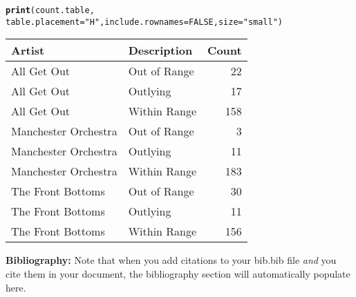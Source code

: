 \documentclass{article}\usepackage[]{graphicx}\usepackage[]{xcolor}
\makeatletter
\newcommand{\hlnum}[1]{\textcolor[rgb]{0.686,0.059,0.569}{#1}}%
\newcommand{\hlsng}[1]{\textcolor[rgb]{0.192,0.494,0.8}{#1}}%
\newcommand{\hldef}[1]{\textcolor[rgb]{0.345,0.345,0.345}{#1}}%
\newcommand{\hlkwc}[1]{\textcolor[rgb]{0.333,0.667,0.333}{#1}}%
\newcommand{\hlkwd}[1]{\textcolor[rgb]{0.737,0.353,0.396}{\textbf{#1}}}%
\newenvironment{kframe}{%
 \def\at@end@of@kframe{}%
 \ifinner\ifhmode%
  \def\at@end@of@kframe{\end{minipage}}%
  \begin{minipage}{\columnwidth}%
 \fi\fi%
 \def\FrameCommand##1{\hskip\@totalleftmargin \hskip-\fboxsep
 \colorbox{shadecolor}{##1}\hskip-\fboxsep
     \hskip-\linewidth \hskip-\@totalleftmargin \hskip\columnwidth}%
 \MakeFramed {\advance\hsize-\width
   \@totalleftmargin\z@ \linewidth\hsize
   \@setminipage}}%
 {\par\unskip\endMakeFramed%
 \at@end@of@kframe}
\makeatother
\begin{document}
\begin{multicols}{2}
\begin{kframe}
\begin{alltt}
 \hlkwd{print}\hldef{(count.table,}
  \hlkwc{table.placement}\hldef{=}\hlsng{"H"}\hldef{,}\hlkwc{include.rownames}\hldef{=}\hlnum{FALSE}\hldef{,}\hlkwc{size}\hldef{=}\hlsng{"small"}\hldef{)}
\end{alltt}
\end{kframe}%
\begin{table}[H]
\centering
\begingroup\small
\begin{tabular}{llr}
  \hline
Artist & Description & Count \\ 
  \hline
All Get Out & Out of Range &  22 \\ 
  All Get Out & Outlying &  17 \\ 
  All Get Out & Within Range & 158 \\ 
  Manchester Orchestra & Out of Range &   3 \\ 
  Manchester Orchestra & Outlying &  11 \\ 
  Manchester Orchestra & Within Range & 183 \\ 
  The Front Bottoms & Out of Range &  30 \\ 
  The Front Bottoms & Outlying &  11 \\ 
  The Front Bottoms & Within Range & 156 \\ 
   \hline
\end{tabular}
\endgroup
\label{count.tab}
\end{table}



\vspace{2em}

\noindent\textbf{Bibliography:} Note that when you add citations to your bib.bib file \emph{and}
you cite them in your document, the bibliography section will automatically populate here.

\begin{tiny}

\end{tiny}
\end{multicols}

\end{document}
